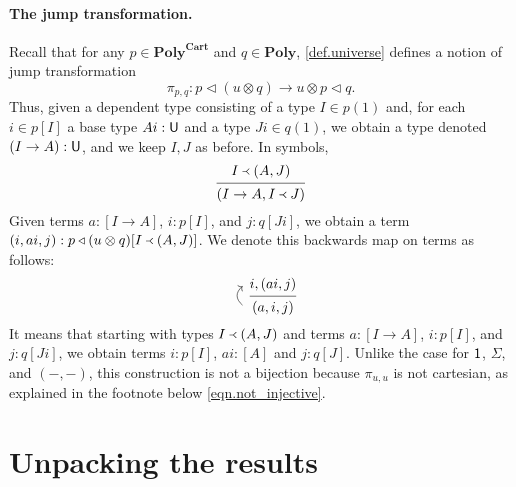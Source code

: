 \documentclass[11pt, one side, article]{memoir}
\newcommand{\upp}{\begin{tikzcd}[row sep=6pt]~\\~\ar[u, bend left=50pt, looseness=1.3, start anchor=east, end anchor=east]\end{tikzcd}}
\theoremstyle{definition}
\theoremstyle{plain}
\newcommand{\Cat}[1]{\mathbf{#1}}%
\newcommand{\tn}[1]{\textnormal{#1}}
\newcommand{\poly}{\Cat{Poly}}
\newcommand{\polycart}{\poly^{\Cat{Cart}}}
\newcommand{\0}{\textsf{0}}
\newcommand{\1}{\tn{\textsf{1}}}
\newcommand{\U}{\tn{\textsf{U}}}
\newcommand{\tri}{\mathbin{\triangleleft}}
\newcommand{\jump}{\pi}
\newcommand{\founds}{\Yleft}
\begin{document}
\paragraph{The jump transformation.}

Recall that for any $p\in\polycart$ and $q\in\poly$, \cref{def.universe} defines a notion of jump transformation
\[\jump_{p,q}\colon p\tri (u\otimes q)\to u\otimes p\tri q.\]
Thus, given a dependent type consisting of a type $I\in p(1)$ and, for each $i\in p[I]$ a base type $A i:\U$ and a type $J i\in q(1)$, we obtain a type denoted $(I\to A):\U$, and we keep $I,J$ as before. In symbols,
\begin{equation*}
  \begin{prooftree}
    \Hypo{I\founds (A, J)}
    \Infer1{(I\to A, I\founds J)}
  \end{prooftree}
\end{equation*}
Given terms $a:[I\to A]$, $i:p[I]$, and $j:q[Ji]$, we obtain a term $(i,a i, j):p\tri(u\otimes q)[I\founds (A,J)]$. We denote this backwards map on terms as follows:
\[
  \begin{prooftree}
    \Hypo{i, (a i, j)}
    \Infer[left label={$\upp$}]1{(a,i,j)}
  \end{prooftree}
\]
It means that starting with types $I\founds(A,J)$ and terms $a:[I\to A]$, $i:p[I]$, and $j:q[Ji]$, we obtain terms $i:p[I]$, $ai:[A]$ and $j:q[J]$.
Unlike the case for $\1$, $\Sigma$, and $(-,-)$, this construction is not a bijection because $\jump_{u,u}$ is not cartesian, as explained in the footnote below \cref{eqn.not_injective}.

\section{Unpacking the results}
\end{document}
